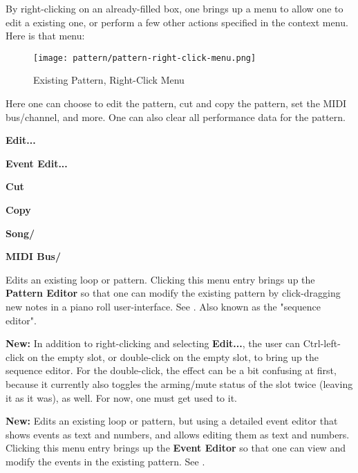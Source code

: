    By right-clicking on an already-filled box, one brings up a menu
   to allow one to edit a existing one, or perform a few other actions
   specified in the context menu.  Here is that menu:

\begin{figure}[H]
   \centering 
   \texttt{[image: pattern/pattern-right-click-menu.png]}
   \caption{Existing Pattern, Right-Click Menu}
   \label{fig:pattern_window_right_click}
\end{figure}

   Here one can choose to edit the pattern, cut and copy the pattern,
   set the MIDI bus/channel, and more.
   One can also clear all performance data for the pattern.
   
   \begin{enumber}
      \item \textbf{Edit...}
      \item \textbf{Event Edit...}
      \item \textbf{Cut}
      \item \textbf{Copy}
      \item \textbf{Song/}
      \item \textbf{MIDI Bus/}
   \end{enumber}

   \setcounter{ItemCounter}{0}      %

   Edits an existing loop or pattern.
   Clicking this menu entry brings up the \textbf{Pattern Editor}
   so that one can modify the existing pattern by click-dragging new notes in a
   piano roll user-interface.
   See .
   Also known as the "sequence editor".

   \textbf{New:}
   In addition to right-clicking and selecting \textbf{Edit...}, the user
   can Ctrl-left-click on the empty slot, or
   double-click on the empty slot, to bring up the sequence
   editor.  For the double-click, the effect can be a bit confusing at first,
   because it currently also toggles the arming/mute status of the slot
   twice (leaving it as it was), as well.  For now, one must get used to it.


   \textbf{New:}
   Edits an existing loop or pattern, but using a detailed event editor that
   shows events as text and numbers, and allows editing them as text and
   numbers.
   Clicking this menu entry brings up the \textbf{Event Editor}
   so that one can view and modify the events in the existing pattern.
   See .

